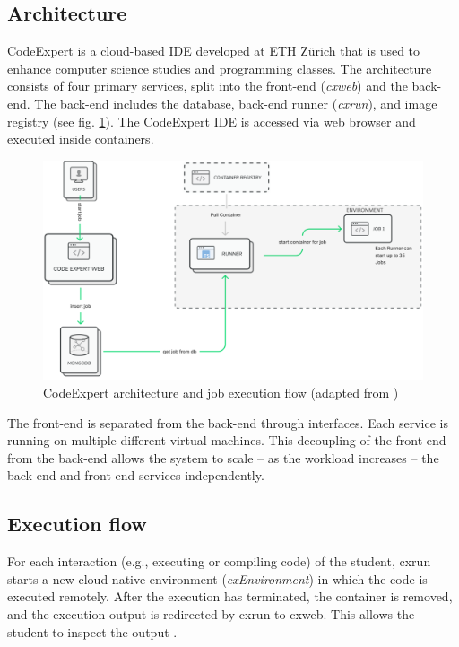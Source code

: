 \subsection{Architecture}
CodeExpert is a cloud-based IDE developed at ETH Zürich that is used to enhance computer science studies and programming classes. The architecture consists of four primary services, split into the front-end (\emph{cxweb}) and the back-end. The back-end includes the database, back-end runner (\emph{cxrun}), and image registry (see fig. \ref{fig:cx-architecture}). The CodeExpert IDE is accessed via web browser and executed inside containers.
\begin{figure}
   \centering
   \includegraphics[width=\textwidth]{thesis/graphics/CodeExpertArchitecture.png}
   \caption{CodeExpert architecture and job execution flow (adapted from \cite{CodeExpertTechnicalOverview})} 
   \label{fig:cx-architecture}
\end{figure}
The front-end is separated from the back-end through interfaces. Each service is running on multiple different virtual machines. This decoupling of the front-end from the back-end allows the system to scale -- as the workload increases -- the back-end and front-end services independently. 

\subsection{Execution flow}\label{CX-execution-flow}
For each interaction (e.g., executing or compiling code) of the student, cxrun starts a new cloud-native environment (\emph{cxEnvironment}) in which the code is executed remotely. After the execution has terminated, the container is removed, and the execution output is redirected by cxrun to cxweb. This allows the student to inspect the output \cite{CXDocs}. 

